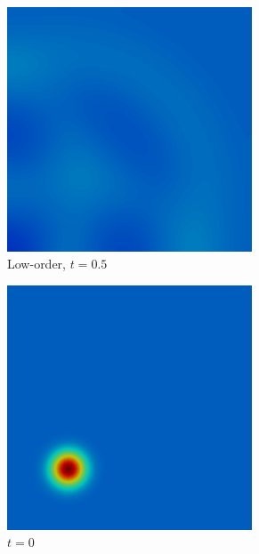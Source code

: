 \begin{frame}
\begin{figure}[h]
\begin{subfigure}{0.3\textwidth}
      \includegraphics[width=0.8\textwidth]{./figures/bathtub_low_t05.png}
      \caption{Low-order, $t=0.5$}
   \end{subfigure}
   \begin{subfigure}{0.3\textwidth}
      \centering
      \includegraphics[width=0.8\textwidth]{./figures/bathtub_initial.png}
      \caption{$t=0$}
   \end{subfigure}
   \begin{subfigure}{0.3\textwidth}
      \centering

\end{subfigure}
\end{figure}
\end{frame}

